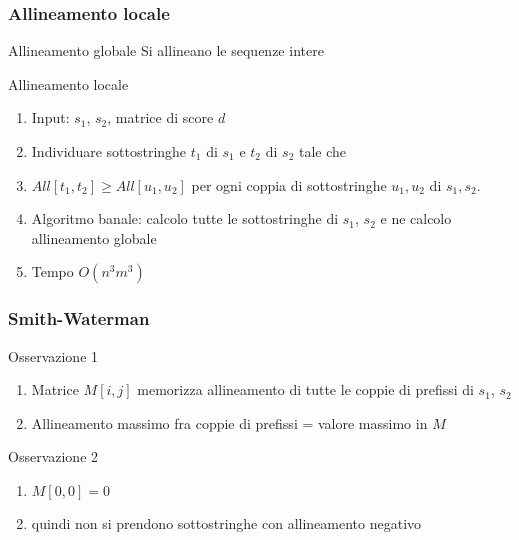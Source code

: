 \begin{frame}[fragile]
\frametitle{Allineamento locale}
\begin{block}{Allineamento globale}
Si allineano le sequenze intere
\end{block}
\begin{block}{Allineamento locale}
\begin{enumerate}
\item
Input: $s_{1}$, $s_{2}$, matrice di score $d$
\item
Individuare sottostringhe $t_{1}$ di $s_{1}$ e $t_{2}$ di $s_{2}$ tale che
\item
$All[t_{1}, t_{2}] \geq All[u_{1}, u_{2}]$ per ogni coppia di sottostringhe
$u_{1}, u_{2}$ di $s_{1}, s_{2}$.
\item
Algoritmo banale:
calcolo tutte le sottostringhe di $s_{1}$, $s_{2}$ e ne
calcolo allineamento globale
\item
Tempo $O(n^{3}m^{3})$
\end{enumerate}
\end{block}
\end{frame}

\begin{frame}[fragile]
\frametitle{Smith-Waterman}
\begin{block}{Osservazione 1}
\begin{enumerate}
\item
Matrice $M[i,j]$ memorizza allineamento di tutte le coppie di \alert{prefissi} di
$s_{1}$, $s_{2}$
\item
Allineamento massimo fra coppie di prefissi = valore massimo in $M$
\end{enumerate}
\end{block}
\begin{block}{Osservazione 2}
\begin{enumerate}
\item
$M[0,0] = 0$
\item
quindi non si prendono sottostringhe con allineamento negativo
\end{enumerate}
\end{block}
\end{frame}


